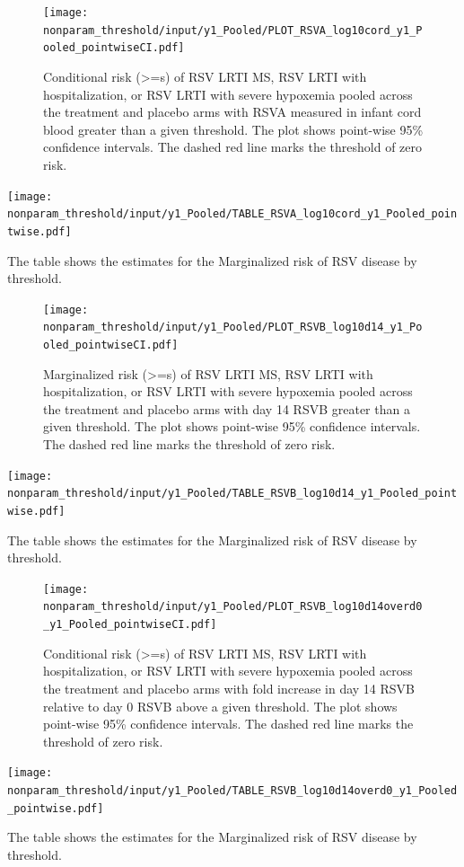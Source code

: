 \documentclass[11pt]{article}
\begin{document}
\begin{figure}[H]
\centering
\texttt{[image: nonparam\_threshold/input/y1\_Pooled/PLOT\_RSVA\_log10cord\_y1\_Pooled\_pointwiseCI.pdf]}
\caption{Conditional risk (>=s) of RSV LRTI MS, RSV LRTI with hospitalization, or RSV LRTI with severe hypoxemia pooled across the treatment and placebo arms with RSVA measured in infant cord blood greater than a given threshold. The plot shows point-wise 95\% confidence intervals. The dashed red line marks the threshold of zero risk.}
\end{figure}

\begin{table}[H]
\centering
\texttt{[image: nonparam\_threshold/input/y1\_Pooled/TABLE\_RSVA\_log10cord\_y1\_Pooled\_pointwise.pdf]}
\caption{The table shows the  estimates for the Marginalized risk of RSV disease by threshold. }
\end{table}

\begin{figure}[H]
\centering
\texttt{[image: nonparam\_threshold/input/y1\_Pooled/PLOT\_RSVB\_log10d14\_y1\_Pooled\_pointwiseCI.pdf]}
\caption{Marginalized risk (>=s) of RSV LRTI MS, RSV LRTI with hospitalization, or RSV LRTI with severe hypoxemia pooled across the treatment and placebo arms with day 14 RSVB greater than a given threshold. The plot shows point-wise 95\% confidence intervals. The dashed red line marks the threshold of zero risk.}
\end{figure}

\begin{table}[H]
\centering
\texttt{[image: nonparam\_threshold/input/y1\_Pooled/TABLE\_RSVB\_log10d14\_y1\_Pooled\_pointwise.pdf]}
\caption{The table shows the  estimates for the Marginalized risk of RSV disease by threshold. }
\end{table}

\begin{figure}[H]
\centering
\texttt{[image: nonparam\_threshold/input/y1\_Pooled/PLOT\_RSVB\_log10d14overd0\_y1\_Pooled\_pointwiseCI.pdf]}
\caption{Conditional risk (>=s) of RSV LRTI MS, RSV LRTI with hospitalization, or RSV LRTI with severe hypoxemia pooled across the treatment and placebo arms with fold increase in day 14 RSVB relative to day 0 RSVB above a given threshold. The plot shows point-wise 95\% confidence intervals. The dashed red line marks the threshold of zero risk.}
\end{figure}

\begin{table}[H]
\centering
\texttt{[image: nonparam\_threshold/input/y1\_Pooled/TABLE\_RSVB\_log10d14overd0\_y1\_Pooled\_pointwise.pdf]}
\caption{The table shows the  estimates for the Marginalized risk of RSV disease by threshold. }
\end{table}
\end{document}
